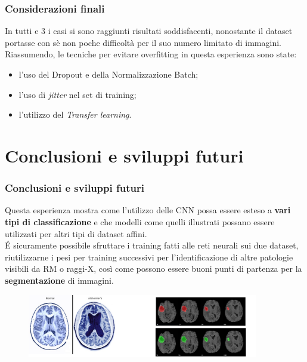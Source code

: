 \documentclass{beamer}
\begin{document}
			\begin{frame}
				\frametitle{Considerazioni finali}
				In tutti e 3 i casi si sono raggiunti risultati soddisfacenti, nonostante il dataset portasse con sè non poche difficoltà 
				per il suo numero limitato di immagini.\\
				Riassumendo, le tecniche per evitare overfitting in questa esperienza sono state:
				\begin{itemize}
					\item l'uso del Dropout e della Normalizzazione Batch;
					\item l'uso di \emph{jitter} nel set di training;
					\item l'utilizzo del \emph{Transfer learning}.
				\end{itemize}
			\end{frame}

\section{Conclusioni e sviluppi futuri}
\begin{frame}
	\frametitle{Conclusioni e sviluppi futuri}
	Questa esperienza mostra come l'utilizzo delle CNN possa essere esteso a \textbf{vari tipi di classificazione} e che 
	modelli come quelli illustrati possano essere utilizzati per altri tipi di dataset affini. \\
	É sicuramente possibile sfruttare
	i training fatti alle reti neurali sui due dataset, riutilizzarne i pesi per training successivi
	 per l'identificazione di altre patologie visibili da RM o raggi-X, così come possono essere buoni punti di partenza per 
	 la \textbf{segmentazione} di immagini.
	 \begin{figure}
		\includegraphics[width=0.9\textwidth]{alzheimer.jpg}
	\end{figure}

\end{frame}
\end{document}

